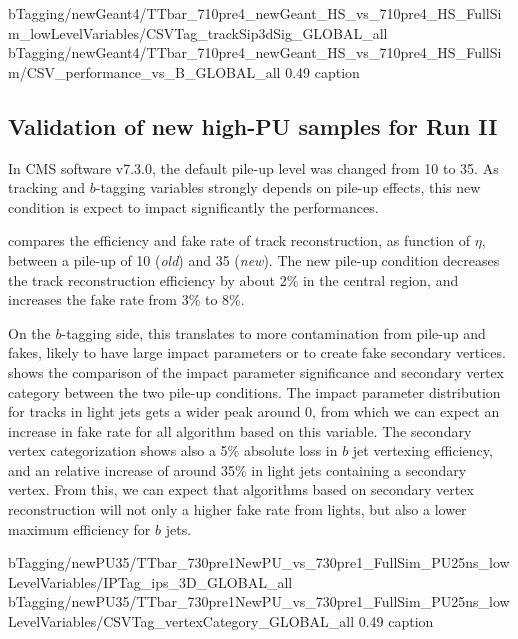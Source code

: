                          {bTagging/newGeant4/TTbar_710pre4_newGeant_HS_vs_710pre4_HS_FullSim_lowLevelVariables/CSVTag_trackSip3dSig_GLOBAL_all}
                         {bTagging/newGeant4/TTbar_710pre4_newGeant_HS_vs_710pre4_HS_FullSim/CSV_performance_vs_B_GLOBAL_all}
                         {0.49}
                         {caption}

        \subsection{Validation of new high-PU samples for Run II}

        In CMS software v7.3.0, the default pile-up level was changed from 10 to 35. As
        tracking and $b$-tagging variables strongly depends on pile-up effects, this
        new condition is expect to impact significantly the performances.

         compares the efficiency and fake rate of track
        reconstruction, as function of $\eta$, between a pile-up of 10 (\emph{old}) and
        35 (\emph{new}). The new pile-up condition decreases the track reconstruction
        efficiency by about 2\% in the central region, and increases the fake rate from
        3\% to 8\%.


        On the $b$-tagging side, this translates to more contamination from pile-up and
        fakes, likely to have large impact parameters or to create fake secondary vertices.
         shows the comparison of the impact
        parameter significance and secondary vertex category between the two pile-up conditions.
        The impact parameter distribution for tracks in light jets gets a wider peak around
        0, from which we can expect an increase in fake rate for all algorithm based on
        this variable. The secondary vertex categorization shows also a 5\% absolute loss
        in $b$ jet vertexing efficiency, and an relative increase of around 35\% in light
        jets containing a secondary vertex. From this, we can expect that algorithms based
        on secondary vertex reconstruction will not only a higher fake rate from lights,
        but also a lower maximum efficiency for $b$ jets.

                         {bTagging/newPU35/TTbar_730pre1NewPU_vs_730pre1_FullSim_PU25ns_lowLevelVariables/IPTag_ips_3D_GLOBAL_all}
                         {bTagging/newPU35/TTbar_730pre1NewPU_vs_730pre1_FullSim_PU25ns_lowLevelVariables/CSVTag_vertexCategory_GLOBAL_all}
                         {0.49}
                         {caption}

